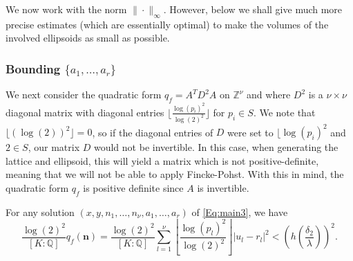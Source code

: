 We now work with the norm $\|\cdot \|_\infty$. However, below we shall give much more precise estimates (which are essentially optimal) to make the volumes of the involved ellipsoids as small as possible. 

\subsubsection{Bounding $\{a_1, \dots, a_{r}\}$}

We next consider the quadratic form $q_f=A^TD^2A$ on $\mathbb{Z}^{\nu}$ and where $D^2$ is a $\nu \times \nu$ diagonal matrix with diagonal entries $\lfloor\frac{\log(p_i)^2}{\log(2)^2}\rfloor$ for $p_i \in S$. We note that $\lfloor(\log(2))^2\rfloor = 0$, so if the diagonal entries of $D$ were set to $\lfloor\log(p_i)^2$ and $2\in S$, our matrix $D$ would not be invertible. In this case, when generating the lattice and ellipsoid, this will yield a matrix which is not positive-definite, meaning that we will not be able to apply Fincke-Pohst. With this in mind, the quadratic form $q_f$ is positive definite since $A$ is invertible. 

\begin{lemma}
For any solution $(x,y, n_1, \dots, n_{\nu}, a_1, \dots, a_r)$ of \eqref{Eq:main3}, we have 
\[\frac{\log(2)^2}{[K:\mathbb{Q}]}q_f(\mathbf{n}) = \frac{\log(2)^2}{[K:\mathbb{Q}]}\sum_{l = 1}^{\nu} \left\lfloor\frac{\log(p_l)^2}{\log(2)^2}\right\rfloor|u_l -r_l|^2 < \left(h\left(\frac{\delta_2}{\lambda}\right)\right)^2.\] 
\end{lemma}

